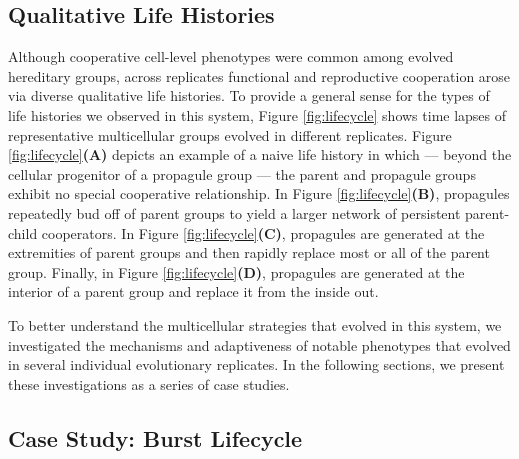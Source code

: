 \subsection{Qualitative Life Histories} \label{sec:life-histories}



Although cooperative cell-level phenotypes were common among evolved hereditary groups, across replicates functional and reproductive cooperation arose via diverse qualitative life histories.
To provide a general sense for the types of life histories we observed in this system, Figure \ref{fig:lifecycle} shows time lapses of representative multicellular groups evolved in different replicates.
Figure \ref{fig:lifecycle}\textbf{(A)} depicts an example of a naive life history in which --- beyond the cellular progenitor of a propagule group --- the parent and propagule groups exhibit no special cooperative relationship.
In Figure \ref{fig:lifecycle}\textbf{(B)}, propagules repeatedly bud off of parent groups to yield a larger network of persistent parent-child cooperators.
In Figure \ref{fig:lifecycle}\textbf{(C)}, propagules are generated at the extremities of parent groups and then rapidly replace most or all of the parent group.
Finally, in Figure \ref{fig:lifecycle}\textbf{(D)}, propagules are generated at the interior of a parent group and replace it from the inside out.

To better understand the multicellular strategies that evolved in this system, we investigated the mechanisms and adaptiveness of notable phenotypes that evolved in several individual evolutionary replicates.
In the following sections, we present these investigations as a series of case studies.



\subsection{Case Study: Burst Lifecycle} \label{sec:gene-regulation}




